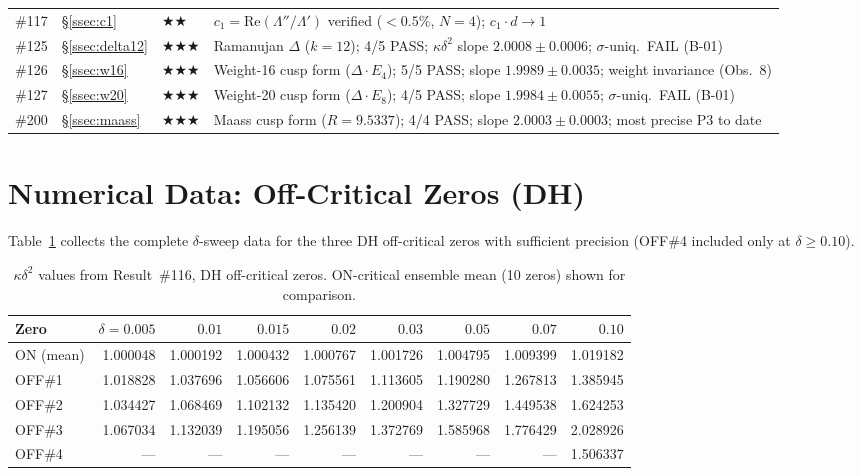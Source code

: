 \documentclass[11pt, a4paper]{article}
\theoremstyle{plain}
\theoremstyle{definition}
\begin{document}
\begin{longtable}{lllp{5.5cm}}
\#117 & \S\ref{ssec:c1}           & \textbf{$\bigstar\bigstar$}     & $c_{1}=\mathrm{Re}(\Lambda''/\Lambda')$ verified ($<0.5\%$, $N=4$); $c_{1}\cdot d\to 1$ \\
\#125 & \S\ref{ssec:delta12}      & \textbf{$\bigstar\bigstar\bigstar$}    & Ramanujan $\Delta$ ($k=12$); 4/5 PASS; $\kappa\delta^{2}$ slope $2.0008\pm0.0006$; $\sigma$-uniq.\ FAIL (B-01) \\
\#126 & \S\ref{ssec:w16}          & \textbf{$\bigstar\bigstar\bigstar$}    & Weight-16 cusp form ($\Delta\cdot E_4$); 5/5 PASS; slope $1.9989\pm0.0035$; weight invariance (Obs.~8) \\
\#127 & \S\ref{ssec:w20}          & \textbf{$\bigstar\bigstar\bigstar$}    & Weight-20 cusp form ($\Delta\cdot E_8$); 4/5 PASS; slope $1.9984\pm0.0055$; $\sigma$-uniq.\ FAIL (B-01) \\
\#200 & \S\ref{ssec:maass}        & \textbf{$\bigstar\bigstar\bigstar$}    & Maass cusp form ($R{=}9.5337$); 4/4 PASS; slope $\mathbf{2.0003\pm0.0003}$; most precise P3 to date \\
\end{longtable}


\section{Numerical Data: Off-Critical Zeros (DH)}
\label{app:dhzeros}

Table~\ref{tab:dhdata} collects the complete $\delta$-sweep data for the
three DH off-critical zeros with sufficient precision (OFF\#4 included
only at $\delta\geq 0.10$).

\begin{table}[ht]
\centering
\caption{$\kappa\delta^{2}$ values from Result~\#116, DH off-critical zeros.
  ON-critical ensemble mean (10 zeros) shown for comparison.}
\label{tab:dhdata}
\small
\begin{tabular}{lrrrrrrrr}
\toprule
Zero & $\delta{=}0.005$ & $0.01$ & $0.015$ & $0.02$ & $0.03$ & $0.05$ & $0.07$ & $0.10$ \\
\midrule
ON (mean) & 1.000048 & 1.000192 & 1.000432 & 1.000767 & 1.001726 & 1.004795 & 1.009399 & 1.019182 \\
OFF\#1 & 1.018828 & 1.037696 & 1.056606 & 1.075561 & 1.113605 & 1.190280 & 1.267813 & 1.385945 \\
OFF\#2 & 1.034427 & 1.068469 & 1.102132 & 1.135420 & 1.200904 & 1.327729 & 1.449538 & 1.624253 \\
OFF\#3 & 1.067034 & 1.132039 & 1.195056 & 1.256139 & 1.372769 & 1.585968 & 1.776429 & 2.028926 \\
OFF\#4 & --- & --- & --- & --- & --- & --- & --- & 1.506337 \\
\bottomrule
\end{tabular}
\end{table}
\end{document}
